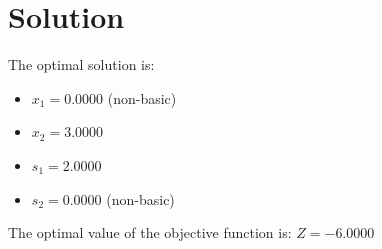 \section*{Solution}
The optimal solution is:
\begin{itemize}
\item $x_{1} = 0.0000$ (non-basic)
\item $x_{2} = 3.0000$
\item $s_{1} = 2.0000$
\item $s_{2} = 0.0000$ (non-basic)
\end{itemize}
The optimal value of the objective function is: $Z = -6.0000$


